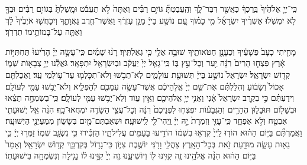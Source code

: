 \documentclass[twoside, openany, parskip=half, 11pt]{book}
\begin{document}
\begin{footnotesize}
%
כִּֽי־יְיָ֤ אֱלֹהֶ֙יךָ֙ בֵּֽרַכְךָ֔ כַּאֲשֶׁ֖ר דִּבֶּר־לָ֑ךְ וְהַֽעֲבַטְתָּ֞ גּוֹיִ֣ם רַבִּ֗ים וְאַתָּה֙ לֹ֣א תַעֲבֹ֔ט וּמָֽשַׁלְתָּ֙ בְּגוֹיִ֣ם רַבִּ֔ים וּבְךָ֖ לֹ֥א יִמְשֹֽׁלוּ׃
%
אַשְׁרֶ֨יךָ‏ יִשְׂרָאֵ֜ל מִ֣י כָמ֗וֹךָ עַ֚ם נוֹשַׁ֣ע בַּייָ֔ מָגֵ֣ן עֶזְרֶ֔ךָ וַאֲשֶׁר־חֶ֖רֶב גַּאֲוָתֶ֑ךָ וְיִכָּחֲשׁ֤וּ אֹיְבֶ֙יךָ֙ לָ֔ךְ וְאַתָּ֖ה עַל־בָּמוֹתֵ֥ימוֹ תִדְרֹֽךְ׃

%
מָחִ֤יתִי כָעָב֙ פְּשָׁעֶ֔יךָ וְכֶעָנָ֖ן חַטֹּאותֶ֑יךָ שׁוּבָ֥ה אֵלַ֖י כִּ֥י גְאַלְתִּֽיךָ׃ רָנּ֨וּ שָׁמַ֜יִם כִּֽי־עָשָׂ֣ה יְיָ֗ הָרִ֙יעוּ֙ תַּחְתִּיּ֣וֹת אָ֔רֶץ פִּצְח֤וּ הָרִים֙ רִנָּ֔ה יַ֖עַר וְכׇל־עֵ֣ץ בּ֑וֹ כִּֽי־גָאַ֤ל יְיָ֙ יַעֲקֹ֔ב וּבְיִשְׂרָאֵ֖ל יִתְפָּאָֽר׃
%
גֹּאֲלֵ֕נוּ יְיָ֥ צְבָא֖וֹת שְׁמ֑וֹ קְד֖וֹשׁ יִשְׂרָאֵֽל׃
%
יִשְׂרָאֵל֙ נוֹשַׁ֣ע בַּייָ֔ תְּשׁוּעַ֖ת עוֹלָמִ֑ים לֹֽא־תֵבֹ֥שׁוּ וְלֹא־תִכָּלְמ֖וּ עַד־ע֥וֹלְמֵי עַֽד׃
%
וַאֲכַלְתֶּ֤ם אָכוֹל֙ וְשָׂב֔וֹעַ וְהִלַּלְתֶּ֗ם אֶת־שֵׁ֤ם יְיָ֙ אֱלֹ֣הֵיכֶ֔ם אֲשֶׁר־עָשָׂ֥ה עִמָּכֶ֖ם לְהַפְלִ֑יא וְלֹא־יֵבֹ֥שׁוּ עַמִּ֖י לְעוֹלָֽם׃ וִידַעְתֶּ֗ם כִּ֣י בְקֶ֤רֶב יִשְׂרָאֵל֙ אָ֔נִי וַאֲנִ֛י יְיָ֥ אֱלֹהֵיכֶ֖ם וְאֵ֣ין ע֑וֹד וְלֹֽא־יֵבֹ֥שׁוּ עַמִּ֖י לְעוֹלָֽם׃
%
כִּֽי־בְשִׂמְחָ֣ה תֵצֵ֔אוּ וּבְשָׁל֖וֹם תּוּבָל֑וּן הֶהָרִ֣ים וְהַגְּבָע֗וֹת יִפְצְח֤וּ לִפְנֵיכֶם֙ רִנָּ֔ה וְכׇל־עֲצֵ֥י הַשָּׂדֶ֖ה יִמְחֲאוּ־כָֽף׃
%
הִנֵּ֨ה אֵ֧ל יְשׁוּעָתִ֛י אֶבְטַ֖ח וְלֹ֣א אֶפְחָ֑ד כִּֽי־עׇזִּ֤י וְזִמְרָת֙ יָ֣הּ יְיָ֔ וַֽיְהִי־לִ֖י לִֽישׁוּעָֽה׃ וּשְׁאַבְתֶּם־מַ֖יִם בְּשָׂשׂ֑וֹן מִמַּעַיְנֵ֖י הַיְשׁוּעָֽה׃ וַאֲמַרְתֶּ֞ם בַּיּ֣וֹם הַה֗וּא הוֹד֤וּ לַֽייָ֙ קִרְא֣וּ בִשְׁמ֔וֹ הוֹדִ֥יעוּ בָעַמִּ֖ים עֲלִילֹתָ֑יו הַזְכִּ֕ירוּ כִּ֥י נִשְׂגָּ֖ב שְׁמֽוֹ׃ זַמְּר֣וּ יְיָ֔ כִּ֥י גֵא֖וּת עָשָׂ֑ה מוּדַ֥עַת זֹ֖את בְּכׇל־הָאָֽרֶץ׃ צַהֲלִ֥י וָרֹ֖נִּי יוֹשֶׁ֣בֶת צִיּ֑וֹן כִּי־גָד֥וֹל בְּקִרְבֵּ֖ךְ קְד֥וֹשׁ יִשְׂרָאֵֽל׃
%
וְאָמַר֙ בַּיּ֣וֹם הַה֔וּא הִנֵּ֨ה אֱלֹהֵ֥ינוּ זֶ֛ה קִוִּ֥ינוּ ל֖וֹ וְיוֹשִׁיעֵ֑נוּ זֶ֤ה יְיָ֙ קִוִּ֣ינוּ ל֔וֹ נָגִ֥ילָה וְנִשְׂמְחָ֖ה בִּישׁוּעָתֽוֹ׃


\end{footnotesize}
\end{document}
